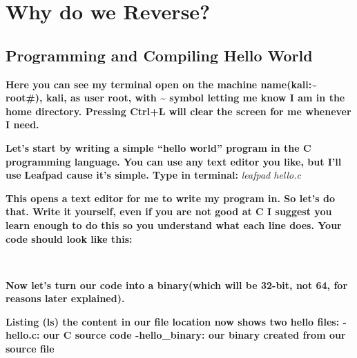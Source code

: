 \documentclass[letterpaper]{article}
\title{}
\author{}
\date{}
\newcommand{\sitfig}[3]{
\begin{figure}[H]
\centering
\makebox[\textwidth][c]{
#2
}
\label{#1}
\end{figure}
}
\newcommand{\sitgfx}[4][scale=1.0]{
\sitfig{#3}{\texttt{[image: \#2]}}{#4}
}
\begin{document}

\newpage
\pagecolor{white}

\tableofcontents

\section{Why do we Reverse?}


\subsection{Programming and Compiling Hello World}

{\centering
\sitgfx[width=6.5in,height=1.778in]{reversing-img002.png}{fig:unk}{TODO CAPTION}
 \par}
\textbf{Here you can see my terminal open on the machine name(kali:\~{} root\#), kali, as user root, with \~{} symbol
letting me know I am in the home directory. Pressing Ctrl+L will clear the screen for me whenever I need.\newline
}

\textbf{Let's start by writing a simple ``hello world'' program in the C programming language. You can use any text
editor you like, but I'll use }\textbf{\textcolor[rgb]{0.21960784,0.4627451,0.11372549}{Leafpad }}\textbf{cause it's
simple.\newline
Type in terminal:}\textit{ leafpad hello.c\newline
\ \ }  
\sitgfx[width=4.8693in,height=3.1602in]{reversing-img003.png}{fig:unk}{TODO CAPTION}
 \textbf{ }

\textbf{This opens a text editor for me to write my program in. So let's do that. Write it yourself, even if you are not
good at C I suggest you learn enough to do this so you understand what each line does. Your code should look like
this:}

\textbf{\newline
\ \ }  
\sitgfx[width=4.3854in,height=1.302in]{reversing-img004.png}{fig:unk}{TODO CAPTION}
 

\textbf{Now let's turn our code into a binary(which will be 32-bit, not 64, for reasons later explained).}

  
\sitgfx[width=6.5in,height=0.5555in]{reversing-img005.png}{fig:unk}{TODO CAPTION}
 \textbf{\newline
Listing (ls) the content in our file location now shows two hello files: \newline
{}-hello.c: our C source code\newline
{}-hello\_binary: our binary created from our source file\newline
\ \ }  
\sitgfx[width=4.7602in,height=0.6146in]{reversing-img006.png}{fig:unk}{TODO CAPTION}
 
\end{document}
